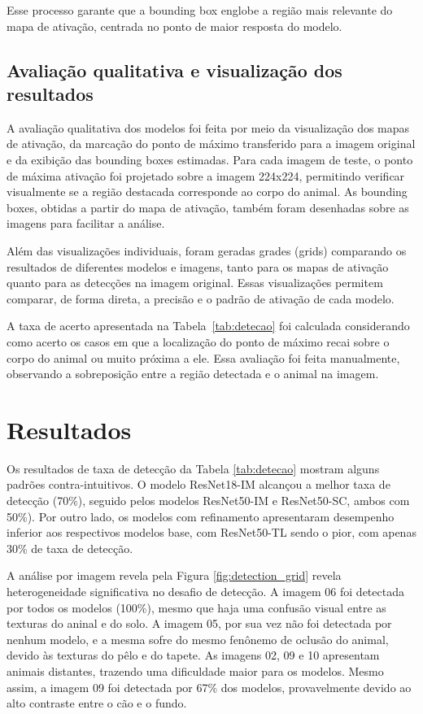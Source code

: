 \documentclass[%
 reprint,
 amsmath,amssymb,
 aps,
]{revtex4-2}
\begin{document}
Esse processo garante que a bounding box englobe a região mais relevante do mapa de ativação, centrada no ponto de maior resposta do modelo.

\subsection{Avaliação qualitativa e visualização dos resultados}

A avaliação qualitativa dos modelos foi feita por meio da visualização dos mapas de ativação, da marcação do ponto de máximo transferido para a imagem original e da exibição das bounding boxes estimadas. Para cada imagem de teste, o ponto de máxima ativação foi projetado sobre a imagem 224x224, permitindo verificar visualmente se a região destacada corresponde ao corpo do animal. As bounding boxes, obtidas a partir do mapa de ativação, também foram desenhadas sobre as imagens para facilitar a análise.

Além das visualizações individuais, foram geradas grades (grids) comparando os resultados de diferentes modelos e imagens, tanto para os mapas de ativação quanto para as detecções na imagem original. Essas visualizações permitem comparar, de forma direta, a precisão e o padrão de ativação de cada modelo.

A taxa de acerto apresentada na Tabela~\ref{tab:detecao} foi calculada considerando como acerto os casos em que a localização do ponto de máximo recai sobre o corpo do animal ou muito próxima a ele. Essa avaliação foi feita manualmente, observando a sobreposição entre a região detectada e o animal na imagem.

\section{Resultados}

Os resultados de taxa de detecção da Tabela \ref{tab:detecao} mostram alguns padrões contra-intuitivos. O modelo ResNet18-IM  alcançou a melhor taxa de detecção (70\%), seguido pelos modelos ResNet50-IM e ResNet50-SC, ambos com 50\%). Por outro lado, os modelos com refinamento apresentaram desempenho inferior aos respectivos modelos base, com ResNet50-TL sendo o pior, com apenas 30\% de taxa de detecção.

A análise por imagem revela pela Figura \ref{fig:detection_grid} revela heterogeneidade significativa no desafio de detecção. A imagem 06 foi detectada por todos os modelos (100\%), mesmo que haja uma confusão visual entre as texturas do aninal e do solo. A imagem 05, por sua vez não foi detectada por nenhum modelo, e a mesma sofre do mesmo fenônemo de oclusão do animal, devido às texturas do pêlo e do tapete. As imagens 02, 09 e 10 apresentam animais distantes, trazendo uma dificuldade maior para os modelos. Mesmo assim, a imagem 09 foi detectada por 67\% dos modelos, provavelmente devido ao alto contraste entre o cão e o fundo.
\end{document}

